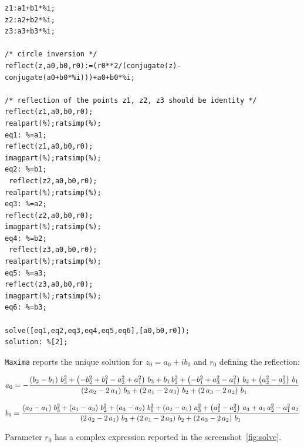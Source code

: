 \documentclass{article}
\begin{document}
{\tiny
\begin{lstlisting}
z1:a1+b1*%i;
z2:a2+b2*%i;
z3:a3+b3*%i;

/* circle inversion */
reflect(z,a0,b0,r0):=(r0**2/(conjugate(z)-conjugate(a0+b0*%i)))+a0+b0*%i;

/* reflection of the points z1, z2, z3 should be identity */
reflect(z1,a0,b0,r0);
realpart(%);ratsimp(%);
eq1: %=a1;
reflect(z1,a0,b0,r0);
imagpart(%);ratsimp(%);
eq2: %=b1;
 reflect(z2,a0,b0,r0);
realpart(%);ratsimp(%);
eq3: %=a2;
reflect(z2,a0,b0,r0);
imagpart(%);ratsimp(%);
eq4: %=b2;
 reflect(z3,a0,b0,r0);
realpart(%);ratsimp(%);
eq5: %=a3;
reflect(z3,a0,b0,r0);
imagpart(%);ratsimp(%);
eq6: %=b3;

solve([eq1,eq2,eq3,eq4,eq5,eq6],[a0,b0,r0]);
solution: %[2];
\end{lstlisting}
}

{\tt Maxima} reports the unique solution for $z_0=a_0+ib_0$ and $r_0$ defining the reflection:

$$
a_{0}=-{{\left(b_{2}-b_{1}\right)\,b_{3}^2+\left(-b_{2}^2+b_{1}^2-
 a_{2}^2+a_{1}^2\right)\,b_{3}+b_{1}\,b_{2}^2+\left(-b_{1}^2+a_{3}^2-
 a_{1}^2\right)\,b_{2}+\left(a_{2}^2-a_{3}^2\right)\,b_{1}}\over{
 \left(2\,a_{2}-2\,a_{1}\right)\,b_{3}+\left(2\,a_{1}-2\,a_{3}\right)
 \,b_{2}+\left(2\,a_{3}-2\,a_{2}\right)\,b_{1}}}
$$


$$b_{0}={{\left(a_{2}-a_{1}\right)\,b_{3}^2+\left(a_{1}-a_{3}\right)
 \,b_{2}^2+\left(a_{3}-a_{2}\right)\,b_{1}^2+\left(a_{2}-a_{1}\right)
 \,a_{3}^2+\left(a_{1}^2-a_{2}^2\right)\,a_{3}+a_{1}\,a_{2}^2-a_{1}^2
 \,a_{2}}\over{\left(2\,a_{2}-2\,a_{1}\right)\,b_{3}+\left(2\,a_{1}-2
 \,a_{3}\right)\,b_{2}+\left(2\,a_{3}-2\,a_{2}\right)\,b_{1}}}$$

Parameter $r_0$ has a complex expression reported in the screenshot~\ref{fig:solve}.
\end{document}
